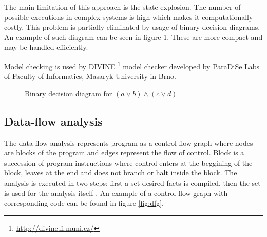 \documentclass[12pt,final,oneside]{fithesis2}
\theoremstyle{definition}
\begin{document}
The main limitation of this approach is the state explosion. The number
of possible executions in complex systems is high which makes it
computationally costly. This problem is partially eliminated by usage
of binary decision diagrams. An example of such diagram can be seen in
figure \ref{fig:bdd}. These are more compact and may be handled
efficiently.

Model checking is used by DIVINE \footnote{\url{http://divine.fi.muni.cz/}}
model checker developed by ParaDiSe Labs of Faculty of Informatics,
Masaryk University in Brno.

\begin{figure}[ht]
\centering
{}
\caption{Binary decision diagram for $(a \lor b) \land (c \lor d)$}
\label{fig:bdd}
\end{figure}


\subsection{Data-flow analysis}

The data-flow analysis represents program as a control flow graph where
nodes are blocks of the program and edges represent the flow of
control. Block is a succession of program instructions where control
enters at the beggining of the block, leaves at the end and does not
branch or halt inside the block. The analysis is executed in two steps:
first a set desired facts is compiled, then the set is used for the
analysis itself \cite{Wogerer05-1}. An example of a control flow graph
with corresponding code can be found in figure \ref{fig:dfg}.
\end{document}
